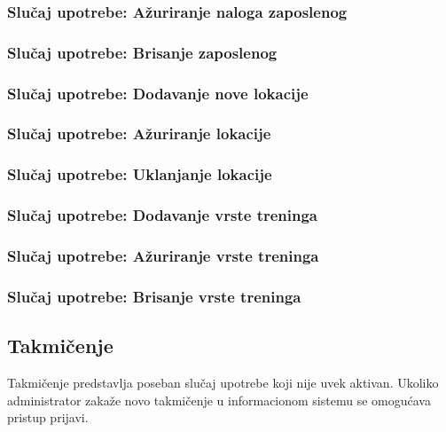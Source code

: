\documentclass[a4paper]{article}
\begin{document}
\subsubsection{Slučaj upotrebe: Ažuriranje naloga zaposlenog}


\subsubsection{Slučaj upotrebe: Brisanje zaposlenog}



\subsubsection{Slučaj upotrebe: Dodavanje nove lokacije}


\subsubsection{Slučaj upotrebe: Ažuriranje lokacije}


\subsubsection{Slučaj upotrebe: Uklanjanje lokacije}



\subsubsection{Slučaj upotrebe: Dodavanje vrste treninga}


\subsubsection{Slučaj upotrebe: Ažuriranje vrste treninga}


\subsubsection{Slučaj upotrebe: Brisanje vrste treninga}



\newpage
\subsection{Takmičenje}
Takmičenje predstavlja poseban slučaj upotrebe koji nije uvek aktivan. Ukoliko administrator zakaže novo takmičenje u informacionom sistemu se omogućava pristup prijavi. 
\end{document}
